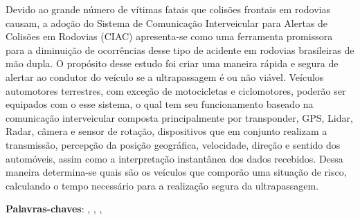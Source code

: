 \begin{resumo}
Devido ao grande número de vítimas fatais que colisões frontais em rodovias causam, a adoção do Sistema de Comunicação Interveicular para Alertas de Colisões em Rodovias (CIAC) apresenta-se como uma ferramenta promissora para a diminuição de ocorrências desse tipo de acidente em rodovias brasileiras de mão dupla. O propósito desse estudo foi criar uma maneira rápida e segura de alertar ao condutor do veículo se a ultrapassagem é ou não viável. Veículos automotores terrestres, com exceção de motocicletas e ciclomotores, poderão ser equipados com o esse sistema, o qual tem seu funcionamento baseado na comunicação interveicular composta principalmente por transponder, GPS, Lidar, Radar, câmera e sensor de rotação, dispositivos que em conjunto realizam a transmissão, percepção da posição geográfica, velocidade, direção e sentido dos automóveis, assim como a interpretação instantânea dos dados recebidos. Dessa maneira determina-se quais são os veículos que comporão uma situação de risco, calculando o tempo necessário para a realização segura da ultrapassagem. 

 \vspace{\onelineskip}

 \noindent
 \textbf{Palavras-chaves}: \imprimirpalavrachaveum, \imprimirpalavrachavedois, \imprimirpalavrachavetres, \imprimirpalavrachavequatro
\end{resumo}
